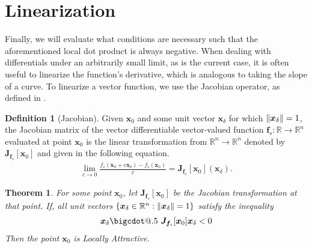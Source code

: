 \documentclass{article}
\makeatletter
\newcommand{\B}[1]{\boldsymbol{#1}}
\newcommand*\bigcdot{\mathpalette\bigcdot@{.5}}
\newcommand*\bigcdot@[2]{\mathbin{\vcenter{\hbox{\scalebox{#2}{$\m@th#1\bullet$}}}}}
\DeclarePairedDelimiter\norm{\lVert}{\rVert}%
\newtheorem{theorem}{Theorem}[section]
\theoremstyle{definition}
\newtheorem{definition}{Definition}[section]
\theoremstyle{remark}
\makeatother
\begin{document}
\section{Linearization}
Finally, we will evaluate what conditions are necessary such that the aforementioned local dot product
is always negative. When dealing with differentials under an arbitrarily small limit, as is the current case,
it is often useful to linearize the function's derivative, which is analogous to taking the slope of a curve.
To linearize a vector function, we use the Jacobian operator, as defined in \cite{AdvancedCalculus}.

\begin{definition}[Jacobian]
  \label{Jacobian Approximation}
  Given $\B{x}_0$ and some unit vector $\B{x}_\delta$ for which $\norm{\B{x}_\delta} = 1$,
  the Jacobian matrix of the vector differentiable vector-valued function $\B{f}_s : \mathbb{R} \to \mathbb{R}^n$ 
  evaluated at point $\B{x}_0$ is the linear transformation 
  from $\mathbb{R}^n \to \mathbb{R}^n$
  denoted by $\B{J}_{\B{f}_s}[\B{x}_0]$ and given in the following equation.
  \begin{align}
  \lim_{c \to 0} \frac{f_s(\B{x}_0 + c \B{x}_\delta) - f_s(\B{x}_0)}{c} = \B{J}_{\B{f}_s}[\B{x}_0](\B{x}_\delta). \label{jacobian}
  \end{align}
\end{definition}

\begin{theorem}
  \label{theorem:Jacobian Local Attractive}
  For some point $\B{x}_0$, let $\B{J}_{\B{f}_s}[\B{x}_0]$ be the Jacobian transformation at that point. 
  If, all unit vectors $\left\{\B{x}_\delta \in \mathbb{R}^n : \norm{\B{x}_\delta} = 1\right\}$ satisfy the inequality
  \begin{align}
    \B{x}_\delta \bigcdot~ \B{J}_{\B{f}_s}[\B{x}_0] \B{x}_\delta < 0 \label{eq:JacobianDot}
  \end{align}
  Then the point $\B{x}_0$ is Locally Attractive.
\end{theorem}
\end{document}
